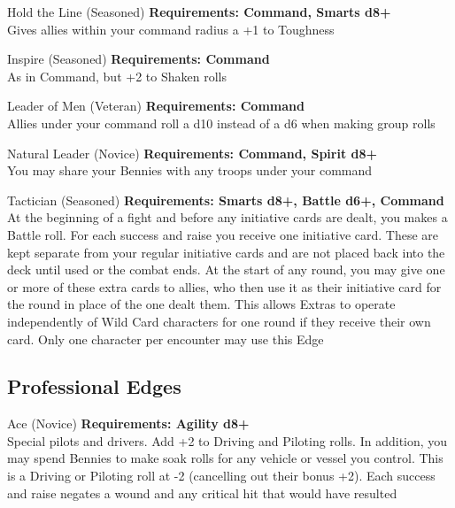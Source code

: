 \begin{multicols}{2}
\begin{genericsection}{Hold the Line (Seasoned)}
\textbf{Requirements: Command, Smarts d8+}\\
Gives allies within your command radius a +1 to Toughness
\end{genericsection}

\begin{genericsection}{Inspire (Seasoned)}
\textbf{Requirements: Command}\\
As in Command, but +2 to Shaken rolls
\end{genericsection}

\begin{genericsection}{Leader of Men (Veteran)}
\textbf{Requirements: Command}\\
Allies under your command roll a d10 instead of a d6 when making group rolls
\end{genericsection}

\begin{genericsection}{Natural Leader (Novice)}
\textbf{Requirements: Command, Spirit d8+}\\
You may share your Bennies with any troops under your command
\end{genericsection}

\begin{genericsection}{Tactician (Seasoned)}
\textbf{Requirements: Smarts d8+, Battle d6+, Command}\\
At the beginning of a fight and before any initiative cards are dealt, you makes a Battle roll. For each success and raise you receive one initiative card. These are kept separate from your regular initiative cards and are not placed back into the deck until used or the combat ends. At the start of any round, you may give one or more of these extra cards to allies, who then use it as their initiative card for the round in place of the one dealt them. This allows Extras to operate independently of Wild Card characters for one round if they receive their own card. Only one character per encounter may use this Edge
\end{genericsection}


%
%
\subsection{Professional Edges}

\begin{genericsection}{Ace (Novice)}
\textbf{Requirements: Agility d8+}\\
Special pilots and drivers. Add +2 to Driving and Piloting rolls. In addition, you may spend Bennies to make soak rolls for any vehicle or vessel you control. This is a Driving or Piloting roll at -2 (cancelling out their bonus +2). Each success and raise negates a wound and any critical hit that would have resulted
\end{genericsection}


\end{multicols}
